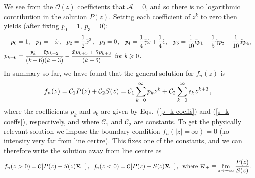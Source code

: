 \documentclass[fleqn,usenatbib]{mnras}
\begin{document}
We see from the $\mathcal{O}(z)$ coefficients that $\mathcal{A} = 0$, and so there is no logarithmic contribution in the solution $P(z)$. Setting each coefficient of $z^k$ to zero then yields (after fixing $p_0 = 1$, $p_3 = 0$):
\begin{align}
    p_0 &= 1 \hspace{1 pt} , \hspace{8 pt} p_1 = - \Tilde{x} \hspace{1 pt} , \hspace{8 pt} p_2 = \dfrac{1}{2}\Tilde{x}^2  \hspace{1 pt} , \hspace{8 pt} p_3 = 0 \hspace{1 pt} , \hspace{8 pt} p_4 = \dfrac{1}{4} \Tilde{\gamma} \Tilde{x} +  \dfrac{1}{4} \Tilde{\epsilon}  \hspace{1 pt} , \hspace{8 pt} p_5 = \dfrac{1}{10} \Tilde{\epsilon} p_1 - \dfrac{1}{5} \Tilde{\gamma} p_2 - \dfrac{1}{10} \Tilde{x} p_4 \hspace{1 pt} , \nonumber \\ p_{k+6} &= \dfrac{p_k + \Tilde{\epsilon} p_{k+2}}{(k+6)(k+3)} - \dfrac{\Tilde{x} p_{k+5} + \Tilde{\gamma} p_{k+3}}{(k+6)} \hspace{5 pt} \textrm{for }k \geq 0 \hspace{1 pt}.\label{p_k coeffs}
\end{align}
In summary so far, we have found that the general solution for $f_n(z)$ is
\begin{equation}
    f_n(z) = \mathcal{C}_1 P(z) + \mathcal{C}_2 S(z) = \mathcal{C}_1 \sum_{k=0}^{\infty} p_k z^k + \mathcal{C}_2 \sum_{k=0}^{\infty} s_k z^{k+3} \hspace{1 pt} ,
\end{equation}
where the coefficients $p_k$ and $s_k$ are given by Eqs.~(\ref{p_k coeffs}) and (\ref{s_k coeffs}), respectively, and where $\mathcal{C}_1$ and $\mathcal{C}_2$ are constants. To get the physically relevant solution we impose the boundary condition $f_n(\lvert z \rvert = \infty) = 0$ (no intensity very far from line centre). This fixes one of the constants, and we can therefore write the solution away from line centre as
\begin{equation}
    f_n(z>0) = \mathcal{C} [P(z) - S(z) \mathcal{R}_+] \hspace{1 pt} , \hspace{5 pt}  f_n(z<0) = \mathcal{C} [P(z) - S(z) \mathcal{R}_-] \hspace{1 pt} ,\hspace{5 pt} \textrm{where } \mathcal{R}_{\pm} \equiv \lim_{z \rightarrow \pm \infty} \dfrac{P(z)}{S(z)} \hspace{1 pt} \label{f_n solution before C determined}.
\end{equation}
\end{document}
